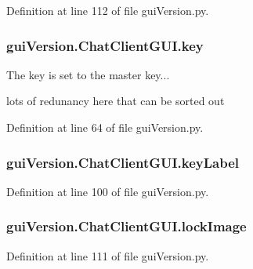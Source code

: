 Definition at line 112 of file gui\+Version.\+py.

\hypertarget{classgui_version_1_1_chat_client_g_u_i_afe7983bc0c4a2f71030e992caca57b43}{}
\subsubsection[{key}]{\setlength{\rightskip}{0pt plus 5cm}gui\+Version.\+Chat\+Client\+G\+U\+I.\+key}\label{classgui_version_1_1_chat_client_g_u_i_afe7983bc0c4a2f71030e992caca57b43}


The key is set to the master key... 

lots of redunancy here that can be sorted out 

Definition at line 64 of file gui\+Version.\+py.

\hypertarget{classgui_version_1_1_chat_client_g_u_i_a5af88dbf7d3768e3b2b3d085c4560345}{}
\subsubsection[{key\+Label}]{\setlength{\rightskip}{0pt plus 5cm}gui\+Version.\+Chat\+Client\+G\+U\+I.\+key\+Label}\label{classgui_version_1_1_chat_client_g_u_i_a5af88dbf7d3768e3b2b3d085c4560345}


Definition at line 100 of file gui\+Version.\+py.

\hypertarget{classgui_version_1_1_chat_client_g_u_i_af4e157319d9a46549b533d5718e8d114}{}
\subsubsection[{lock\+Image}]{\setlength{\rightskip}{0pt plus 5cm}gui\+Version.\+Chat\+Client\+G\+U\+I.\+lock\+Image}\label{classgui_version_1_1_chat_client_g_u_i_af4e157319d9a46549b533d5718e8d114}


Definition at line 111 of file gui\+Version.\+py.

